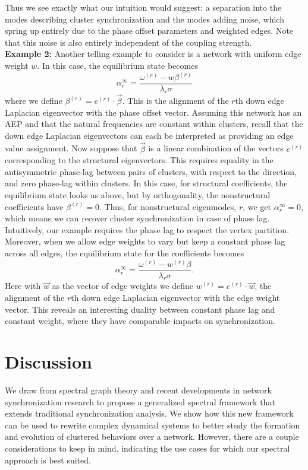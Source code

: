 \documentclass[%
 aip,
 amsmath,amssymb,
preprint,
reprint, onecolumn %
]{revtex4-1}
\begin{document}
Thus we see exactly what our intuition would suggest: a separation into the modes describing cluster synchronization and the modes adding noise, which spring up entirely due to the phase offset parameters and weighted edges. Note that this noise is also entirely independent of the coupling strength.\\

\textbf{Example 2: } Another telling example to consider is a network with uniform edge weight $w$. In this case, the equilibrium state becomes
\begin{equation*}
    \alpha_r^{\infty} =\frac{\omega^{(r)}-w\beta^{(r)}}{\lambda_r \sigma}
\end{equation*}
where we define $\beta^{(r)}=e^{(r)}\cdot \vec{\beta}$. This is the alignment of the $r$th down edge Laplacian eigenvector with the phase offset vector. Assuming this network has an AEP and that the natural frequencies are constant within clusters, recall that the down edge Laplacian eigenvectors can each be interpreted as providing an edge value assignment. Now suppose that $\vec{\beta}$ is a linear combination of the vectors $e^{(r)}$ corresponding to the structural eigenvectors. This requires equality in the antisymmetric phase-lag between pairs of clusters, with respect to the direction, and zero phase-lag within clusters. In this case, for structural coefficients, the equilibrium state looks as above, but by orthogonality, the nonstructural coefficients have $\beta^{(r)}=0$. Thus, for nonstructural eigenmodes, $r$, we get $\alpha^{\infty}_r = 0$, which means we can recover cluster synchronization in case of phase lag. Intuitively, our example requires the phase lag to respect the vertex partition. 
Moreover, when we allow edge weights to vary but keep a constant phase lag across all edges, the equilibrium state for the coefficients becomes
\begin{equation*}
    \alpha_r^{\infty} =\frac{\omega^{(r)}-w^{(r)}\beta}{\lambda_r \sigma}.
\end{equation*}
Here with $\vec{w}$ as the vector of edge weights we define $w^{(r)}=e^{(r)}\cdot \vec{w}$, the alignment of the $r$th down edge Laplacian eigenvector with the edge weight vector. This reveals an interesting duality between constant phase lag and constant weight, where they have comparable impacts on synchronization.






\section{Discussion}\label{discuss}
We draw from spectral graph theory and recent developments in network synchronization research to propose a generalized spectral framework that extends traditional synchronization analysis. We show how this new framework can be used to rewrite complex dynamical systems to better study the formation and evolution of clustered behaviors over a network. However, there are a couple considerations to keep in mind, indicating the use cases for which our spectral approach is best suited.
\end{document}
